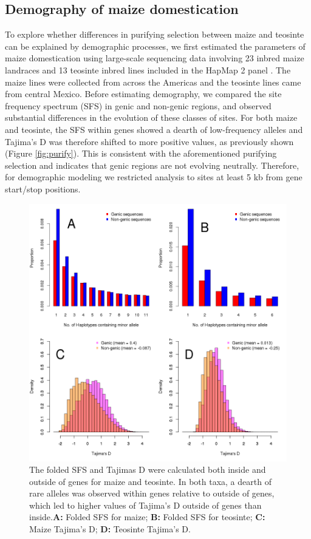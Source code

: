 \documentclass{pnastwo}
\begin{document}
\begin{article}
\subsection{Demography of maize domestication}
To explore whether differences in purifying selection between maize
and teosinte can be explained by demographic processes, we
first estimated the parameters of maize domestication using large-scale
sequencing data involving 23 inbred maize
landraces and 13 teosinte inbred lines included in the HapMap 2 panel
\cite{chia2012}. The maize
lines were collected from across the Americas and the teosinte lines
came from central Mexico. Before estimating demography, we compared
the site frequency spectrum (SFS) in genic and non-genic regions, and
observed substantial differences in the evolution of these classes of
sites. For both maize and teosinte, the SFS within genes showed a
dearth of low-frequency alleles and Tajima's D
\cite{tajima1989} was therefore shifted
to more positive values, as previously shown (Figure \ref{fig:purify}). This is consistent with the aforementioned purifying
selection and indicates that genic regions are not evolving
neutrally. Therefore, for demographic modeling we restricted analysis
to sites at least 5 kb from gene start/stop positions.

\begin{figure}[!htb]
\centering
\includegraphics[width=.5\textwidth]{FigsAndFiles/SFS_and_Tajima.png}
\caption{The folded SFS and Tajimas D were calculated both inside and outside of genes for maize and teosinte. In both taxa, a dearth of rare alleles was observed within genes relative to outside of genes, which led to higher values of Tajima's D outside of genes than inside.{\bf A:} Folded SFS for maize; {\bf B:} Folded SFS for teosinte; {\bf C:} Maize Tajima's D; {\bf D:} Teosinte Tajima's D.  \label{fig:sfs} }
\end{figure}



\end{article}
\end{document}
